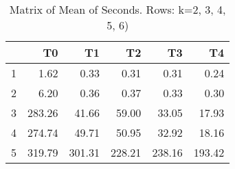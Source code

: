 \begin{table}[ht]
\centering
\begin{tabular}{rrrrrr}
  \hline
 & T0 & T1 & T2 & T3 & T4 \\ 
  \hline
1 & 1.62 & 0.33 & 0.31 & 0.31 & 0.24 \\ 
  2 & 6.20 & 0.36 & 0.37 & 0.33 & 0.30 \\ 
  3 & 283.26 & 41.66 & 59.00 & 33.05 & 17.93 \\ 
  4 & 274.74 & 49.71 & 50.95 & 32.92 & 18.16 \\ 
  5 & 319.79 & 301.31 & 228.21 & 238.16 & 193.42 \\ 
   \hline
\end{tabular}
\caption{Matrix of Mean of Seconds.  Rows: k=2, 3, 4, 5, 6)} 
\end{table}
